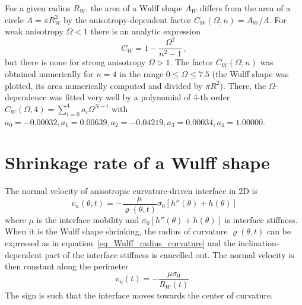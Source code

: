 For a given radius $R_W$, the area of a Wulff shape $A_W$ differs from the area of a circle $A=\pi R_W^2$ by the anisotropy-dependent factor $C_W(\Omega,n) = A_W/A$. For weak anisotropy $\Omega<1$ there is an analytic expression 
\begin{equation}
	C_W = 1-\frac{\Omega^2}{n^2-1} \,,
\end{equation}
but there is none for strong anisotropy $\Omega>1$. The factor $C_W(\Omega,n)$ was obtained numerically for $n=4$ in the range $0\leq\Omega\leq7.5$ (the Wulff shape was plotted, its area numerically computed and divided by $\pi R^2$). There, the $\Omega$-dependence was fitted very well  by a polynomial of 4-th order $C_W(\Omega,4)= \sum_{i=0}^4a_i\Omega^{N-i}$ with $a_0=-0.00032 ,a_1=0.00639 ,a_2=-0.04219 , a_3=0.00034 , a_4=1.00000$. 

\section{Shrinkage rate of a Wulff shape} \label{sec_appendix_wulff_shrrate}
The normal velocity of anisotropic curvature-driven interface in 2D is~\cite{Abdeljawad2018}
\begin{equation}
	v_n(\theta,t)=-\frac{\mu}{\varrho(\theta,t)}\sigma_0[h''(\theta) + h(\theta)] 
\end{equation}
where $\mu$ is the interface mobility and $\sigma_0[h''(\theta) + h(\theta)]$ is interface stiffness. When it is the
Wulff shape shrinking, the radius of curvature $\varrho(\theta,t)$ can be expressed as in equation~\eqref{eq_Wulff_radius_curvature} and the inclination-dependent part of the interface stiffness is cancelled out. The normal velocity is then constant along the perimeter
\begin{equation} \label{eq_wulff_norm_velocity}
	v_n(t) = - \frac{\mu \sigma_0}{R_W(t)} \,.
\end{equation}
The sign is such that the interface moves towards the center of curvature.

